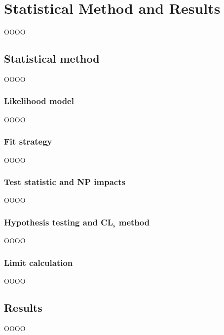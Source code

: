 \chapter{Statistical Method and Results}
\label{chap:chapter-10}

OOOO

\section{Statistical method}
\label{heading:Chapters-CH10-2}

OOOO

\subsection{Likelihood model}
\label{heading:Chapters-CH10-3}

OOOO

\subsection{Fit strategy}
\label{heading:Chapters-CH10-4}

OOOO

\subsection{Test statistic and NP impacts}
\label{heading:Chapters-CH10-5}

OOOO

\subsection{Hypothesis testing and CL$_{\mathrm{s}}$ method}
\label{heading:Chapters-CH10-6}

OOOO

\subsection{Limit calculation}
\label{heading:Chapters-CH10-7}

OOOO

\section{Results}
\label{heading:Chapters-CH10-8}

OOOO

